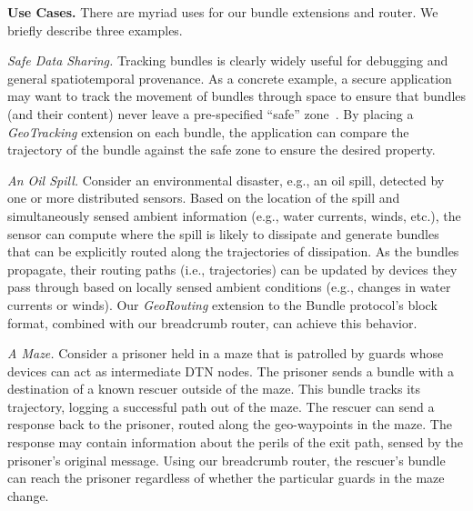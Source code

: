 %
%

{\bf Use Cases.} There are myriad uses for our bundle extensions and
router. We briefly describe three examples.

{\it Safe Data Sharing.} Tracking bundles is clearly widely useful for
debugging and general spatiotemporal provenance. As a concrete
example, a secure application may want to track the movement of
bundles through space to ensure that bundles (and their content) never
leave a pre-specified ``safe'' zone~\cite{michel12:spatiotemporal}. By
placing a {\em GeoTracking} extension on each bundle, the application
can compare the trajectory of the bundle against the safe zone to
ensure the desired property.

{\it An Oil Spill.} Consider an environmental disaster, e.g., an oil
spill, detected by one or more distributed sensors. Based on the
location of the spill and simultaneously sensed ambient information
(e.g., water currents, winds, etc.), the sensor can compute where the
spill is likely to dissipate and generate bundles that can be
explicitly routed along the trajectories of dissipation. As the
bundles propagate, their routing paths (i.e., trajectories) can be
updated by devices they pass through based on locally sensed ambient
conditions (e.g., changes in water currents or winds). Our {\em
  GeoRouting} extension to the Bundle protocol's block format,
combined with our {\sc breadcrumb} router, can achieve this behavior.

{\it A Maze.} 
Consider a prisoner held in a maze that is patrolled by guards whose devices can act as intermediate DTN nodes. The prisoner sends a bundle with a destination of a known rescuer outside of the maze. This bundle tracks its trajectory, logging a successful path out of the maze. The rescuer can send a response back to the prisoner, routed along the geo-waypoints in the maze. The response may contain information about the perils of the exit path, sensed by the prisoner's original message. Using our {\sc breadcrumb} router, the rescuer's bundle can reach the prisoner regardless of whether the particular guards in the maze change.






